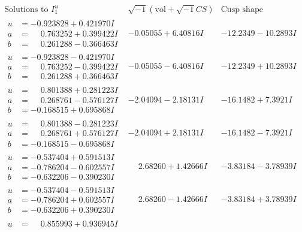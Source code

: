 \documentclass[1p]{elsarticle_modified}
\theoremstyle{definition}
\newcommand{\I}{\sqrt{-1}}
\begin{document}
$$\begin{array}{c|c|c}  
\text{Solutions to }I^u_{1}& \I (\text{vol} + \sqrt{-1}CS) & \text{Cusp shape}\\
 \hline 
\begin{aligned}
u &= -0.923828 + 0.421970 I \\
a &= \phantom{-}0.763252 + 0.399422 I \\
b &= \phantom{-}0.261288 - 0.366463 I\end{aligned}
 & -0.05055 + 6.40816 I & -12.2349 - 10.2893 I \\ \hline\begin{aligned}
u &= -0.923828 - 0.421970 I \\
a &= \phantom{-}0.763252 - 0.399422 I \\
b &= \phantom{-}0.261288 + 0.366463 I\end{aligned}
 & -0.05055 - 6.40816 I & -12.2349 + 10.2893 I \\ \hline\begin{aligned}
u &= \phantom{-}0.801388 + 0.281223 I \\
a &= \phantom{-}0.268761 - 0.576127 I \\
b &= -0.168515 + 0.695868 I\end{aligned}
 & -2.04094 - 2.18131 I & -16.1482 + 7.3921 I \\ \hline\begin{aligned}
u &= \phantom{-}0.801388 - 0.281223 I \\
a &= \phantom{-}0.268761 + 0.576127 I \\
b &= -0.168515 - 0.695868 I\end{aligned}
 & -2.04094 + 2.18131 I & -16.1482 - 7.3921 I \\ \hline\begin{aligned}
u &= -0.537404 + 0.591513 I \\
a &= -0.786204 - 0.602557 I \\
b &= -0.632206 - 0.390230 I\end{aligned}
 & \phantom{-}2.68260 + 1.42666 I & -3.83184 - 3.78939 I \\ \hline\begin{aligned}
u &= -0.537404 - 0.591513 I \\
a &= -0.786204 + 0.602557 I \\
b &= -0.632206 + 0.390230 I\end{aligned}
 & \phantom{-}2.68260 - 1.42666 I & -3.83184 + 3.78939 I \\ \hline\begin{aligned}
u &= \phantom{-}0.855993 + 0.936945 I \\

\end{aligned}
\end{array}$$
\end{document}
